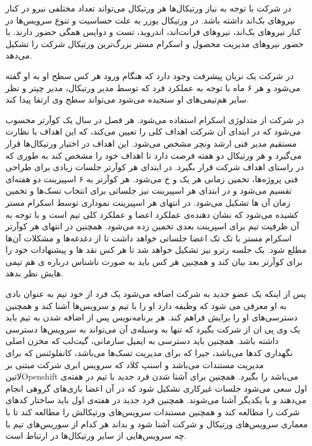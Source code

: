\documentclass[a4]{report}
\begin{document}
در شرکت با توجه به نیاز ورتیکال‌ها هر ورتیکال می‌تواند تعداد مختلفی نیرو در کنار نیروهای بک‌اند داشته باشد.
در ورتیکال یوزر به علت حساسیت و تنوع سرویس‌ها در کنار نیروهای بک‌اند،
نیروهای فرانت‌اند، اندروید، تست و دواپس همگی حضور دارند.
با حضور نیروهای مدیریت محصول و اسکرام مستر بزرگ‌ترین ورتیکال شرکت را تشکیل می‌دهد.

در شرکت یک نربان پیشرفت وجود دارد که هنگام ورود هر کس سطح او به او گفته می‌شود و هر ۶ ماه با توجه به عملکرد فرد که توسط مدیر ورتیکال، مدیر چپتر
و نظر سایر هم‌تیمی‌های او سنجیده می‌شود می‌تواند سطح وی ارتقا پیدا کند.

در شرکت از متدلوژی اسکرام استفاده می‌شود.
هر فصل در سال یک کوآرتر محسوب می‌شود که در ابتدای آن شرکت اهداف کلی را تعیین می‌کند،
که این اهداف با نظارت مستقیم مدیر فنی ارشد ونچر مشخص می‌شود.
این اهداف در اختیار ورتیکال‌ها قرار می‌گیرد و هر ورتیکال دو هفته فرصت دارد تا اهداف خود را مشخص کند به طوری که در راستای اهداف شرکت قرار بگیرد.
در ابتدای هر کوآرتر جلسات زیادی برای طراحی فنی پروژه‌ها، تخمین زمانی هر یک و ‌خ می‌شود.
هر کوآرتر به ۶ اسپیرینت دو هفته‌ای تقسیم می‌شود و در ابتدای هر اسپیرینت نیز جلساتی برای انتخاب تسک‌ها و تخمین زمان آن ها تشکیل می‌شود.
در انتهای هر اسپیرینت نموداری توسط اسکرام مستر کشیده می‌شود که نشان دهنده‌ی عملکرد اعضا و عملکرد کلی تیم است
و با توجه به آن ظرفیت تیم برای اسپرینت بعدی تخمین زده می‌شود.
همچنین در انتهای هر کوآرتر اسکرام مستر با تک تک اعضا جلساتی خواهد داشت تا از دغدغه‌ها و مشکلات آن‌ها مطلع شود.
یک جلسه رترو نیز تشکیل خواهد شد تا هر کس نقد ها و پیشنهادات خود را برای کوآرتر بعد بیان کند و
همچنین هر کس باید به صورت ناشناس درباره ی هم تیمی هایش نظر بدهد.

پس از اینکه یک عضو جدید به شرکت اضافه می‌شود یک فرد از خود تیم به عنوان بادی به او معرفی می شود
که وظیفه دارد او را با تیم و سرویس‌ها آشنا کند و همچنین دسترسی‌های او را برایش فراهم کند.
هر برنامه‌نویس پس از اضافه شدن به تیم باید یک وی پی ان از شرکت بگیرد که تنها به وسیله‌ی آن می‌تواند به سرویس‌ها دسترسی داشته باشد.
همچنین باید دسترسی به ایمیل سازمانی، گیت‌لب که مخزن اصلی نگهداری کدها می‌باشد،
جیرا که برای مدیریت تسک‌ها می‌باشد،
کانفلوئنس که برای مدیریت مستندات می‌باشد
و اسنپ کلاد که سرویس ابری شرکت مبتنی بر ‌لاتین{Openshift} می‌باشد
را بگیرد.
همچنین برای آشنا شدن فرد جدید با تیم در هفته‌ی اول سعی می‌شود جلسات غیرکاری تشکیل شود که در آن اعضا بازی‌های گروهی انجام می‌دهند
و با یکدیگر آشنا می‌شوند.
همچنین فرد جدید در هفته‌ی اول باید ساختار کد‌های شرکت را مطالعه کند
و همچنین مستندات سرویس‌های ورتیکالش را مطالعه کند
تا با معماری سرویس‌های ورتیکال و شرکت آشنا شود
و بداند هر کدام از سوریس‌های تیم با چه سرویس‌هایی از سایر ورتیکال‌ها در ارتباط است.
\end{document}
